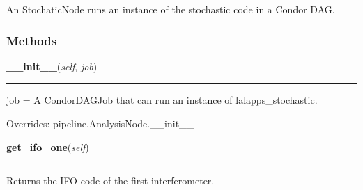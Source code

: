 An StochaticNode runs an instance of the stochastic code in a Condor DAG.



  \subsubsection{Methods}

    \label{stochastic:StochasticNode:__init__}
    \vspace{0.5ex}

    \begin{boxedminipage}{\textwidth}

    \raggedright \textbf{\_\_init\_\_}(\textit{self}, \textit{job})

    \vspace{-1.5ex}

    \rule{\textwidth}{0.5\fboxrule}
    job = A CondorDAGJob that can run an instance of lalapps\_stochastic.

    \vspace{1ex}

      Overrides: pipeline.AnalysisNode.\_\_init\_\_

    \end{boxedminipage}

    \label{stochastic:StochasticNode:get_ifo_one}
    \vspace{0.5ex}

    \begin{boxedminipage}{\textwidth}

    \raggedright \textbf{get\_ifo\_one}(\textit{self})

    \vspace{-1.5ex}

    \rule{\textwidth}{0.5\fboxrule}
    Returns the IFO code of the first interferometer.

    \vspace{1ex}

    \end{boxedminipage}

    \label{stochastic:StochasticNode:get_ifo_two}
    \vspace{0.5ex}

